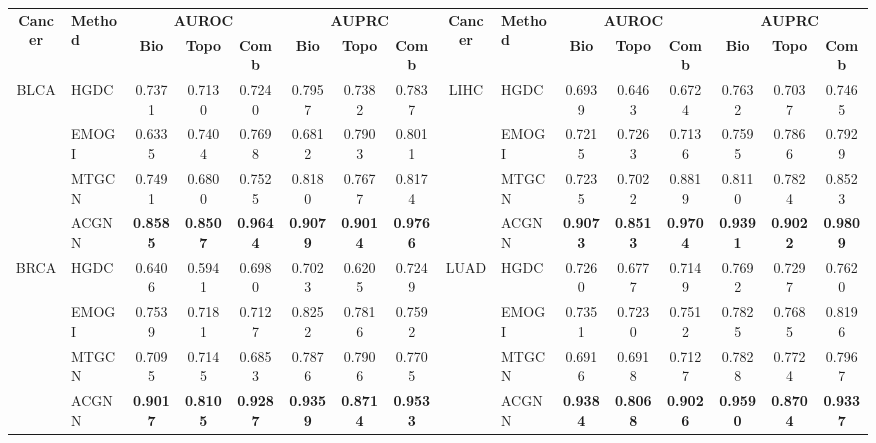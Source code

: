 \begin{table*}[h]
	\centering
	\renewcommand{\arraystretch}{1.1} %
	\setlength{\tabcolsep}{3pt} %
	\small %
	\begin{tabular}{c l ccc ccc  c l ccc ccc}
		\toprule
		\multirow{2}{*}{\textbf{Cancer}} & \multirow{2}{*}{\textbf{Method}} & 
		\multicolumn{3}{c}{\textbf{AUROC}} & \multicolumn{3}{c}{\textbf{AUPRC}} &
		\multirow{2}{*}{\textbf{Cancer}} & \multirow{2}{*}{\textbf{Method}} & 
		\multicolumn{3}{c}{\textbf{AUROC}} & \multicolumn{3}{c}{\textbf{AUPRC}} \\
		\cmidrule(lr){3-5} \cmidrule(lr){6-8} \cmidrule(lr){11-13} \cmidrule(lr){14-16}
		& & \textbf{Bio} & \textbf{Topo} & \textbf{Comb} & \textbf{Bio} & \textbf{Topo} & \textbf{Comb} & 
		& & \textbf{Bio} & \textbf{Topo} & \textbf{Comb} & \textbf{Bio} & \textbf{Topo} & \textbf{Comb} \\
		\midrule
		\multirow{4}{*}{BLCA} & HGDC & 0.7371 & 0.7130 & 0.7240 & 0.7957 & 0.7382 & 0.7837  & 
		\multirow{4}{*}{LIHC} & HGDC & 0.6939 & 0.6463 & 0.6724 & 0.7632 & 0.7037 & 0.7465 \\
		& EMOGI & 0.6335 & 0.7404 & 0.7698 & 0.6812 & 0.7903 & 0.8011  & 
		& EMOGI & 0.7215 & 0.7263 & 0.7136 & 0.7595 & 0.7866 & 0.7929 \\
		& MTGCN & 0.7491 & 0.6800 & 0.7525 & 0.8180 & 0.7677 & 0.8174 &  
		& MTGCN & 0.7235& 0.7022 & 0.8819 & 0.8110 & 0.7824 & 0.8523 \\
		& ACGNN & \textbf{0.8585} & \textbf{0.8507} & \textbf{0.9644} & \textbf{0.9079} & \textbf{0.9014} & \textbf{0.9766} & 
		& ACGNN & \textbf{0.9073} & \textbf{0.8513} & \textbf{0.9704} & \textbf{0.9391} & \textbf{0.9022} & \textbf{0.9809} \\
		\midrule
		\multirow{4}{*}{BRCA} & HGDC & 0.6406 & 0.5941 & 0.6980 & 0.7023& 0.6205 & 0.7249  & 
		\multirow{4}{*}{LUAD} & HGDC & 0.7260 & 0.6777 & 0.7149 & 0.7692 & 0.7297 & 0.7620 \\
		& EMOGI & 0.7539 & 0.7181 & 0.7127 & 0.8252 & 0.7816 & 0.7592  & 
		& EMOGI & 0.7351 & 0.7230& 0.7512 & 0.7825 & 0.7685 & 0.8196 \\
		& MTGCN & 0.7095 & 0.7145& 0.6853 & 0.7876 & 0.7906& 0.7705 & 
		& MTGCN & 0.6916 & 0.6918 & 0.7127 & 0.7828& 0.7724 & 0.7967 \\
		& ACGNN & \textbf{0.9017} & \textbf{0.8105} & \textbf{0.9287} & \textbf{0.9359} & \textbf{0.8714} & \textbf{0.9533} & 
		& ACGNN & \textbf{0.9384} & \textbf{0.8068} & \textbf{0.9026} & \textbf{0.9590} & \textbf{0.8704} & \textbf{0.9337} \\
		

\end{tabular}
\end{table*}
